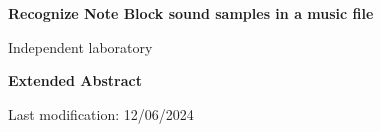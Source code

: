 
\begin{titlepage}
    \begin{center}
        \vspace*{1cm}
            
        \Huge
        \textbf{Recognize Note Block sound samples in a music file}
            
        \vspace{0.5cm}
        \LARGE
        Independent laboratory
            
        \vspace{2.5cm}
            
        \textbf{Extended Abstract}\\
            
        \vfill
            
            
        \vspace{0.8cm}
            
            
        \Large
        Last modification: 12/06/2024
        \vspace*{1cm}
            
    \end{center}
\end{titlepage}
